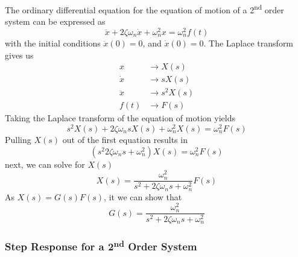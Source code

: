 \documentclass[12pt,letter]{article}
\numberwithin{ex}{section} %
\numberwithin{re}{section} %
\numberwithin{equation}{section}	%
\begin{document}
The ordinary differential equation for the equation of motion of a 2\textsuperscript{nd} order system can be expressed as
\begin{equation}
\ddot{x} + 2 \zeta \omega_n \dot{x} + \omega_n^2 x = \omega_n^2 f(t)
\end{equation}
with the initial conditions $\ddot{x}(0) = 0$, and $\dot{x}(0) = 0$. The Laplace transform gives us
\begin{align}
x & \rightarrow X(s) \\
\dot{x} & \rightarrow sX(s) \nonumber \\
\ddot{x} & \rightarrow s^2X(s) \nonumber \\
f(t) & \rightarrow F(s) \nonumber 
\end{align}
Taking the Laplace transform of the equation of motion yields
\begin{equation}
s^2X(s) + 2 \zeta \omega_n s X(s) + \omega_n^2 X(s) = \omega_n^2 F(s)
\end{equation}
Pulling $X(s)$ out of the first equation results in
\begin{equation}
(s^2 2 \zeta \omega_n s + \omega_n^2)X(s) = \omega_n^2 F(s)
\end{equation}
next, we can solve for $X(s)$
\begin{equation}
X(s) = \frac{\omega_n^2}{s^2 + 2 \zeta \omega_n s + \omega_n^2}F(s)
\end{equation}
As $X(s) = G(s)F(s)$, it we can show that
\begin{equation}
G(s) = \frac{\omega_n^2}{s^2 + 2 \zeta \omega_n s + \omega_n^2}
\end{equation}



\subsubsection{Step Response for a 2\textsuperscript{nd} Order System }
\end{document}
